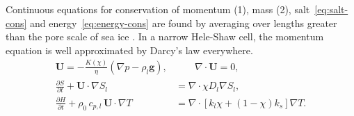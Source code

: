 \documentclass[landscape,24pt, a0paper,colspace=8mm,blockverticalspace=8mm]{tikzposter}
\begin{document}
\begin{columns}
{%



\vspace{-0.9em} } 

\begin{subcolumns}  



{

\begin{minipage}[t]{0.49\linewidth}
Continuous equations for conservation of momentum (1), mass (2), salt~\eqref{eq:salt-cons} and energy~\eqref{eq:energy-cons} are found by averaging over lengths greater than the pore scale of sea ice \cite{Worster1991,LeBars2006}. In a narrow Hele-Shaw cell, the momentum equation is well approximated by Darcy's law everywhere. 
\vspace{0.2em}
\begin{align}


     \mathbf{U} = -\frac{K(\chi)}{\eta} \left(\nabla p - \rho_l \mathbf{g} \right), & \quad \quad   \nabla \cdot \mathbf{U} = 0, \tag{1, 2}  \\
    \frac{\partial S}{\partial t} + \mathbf{U} \cdot \nabla S_l &= \nabla \cdot \chi D_l \nabla S_l, \label{eq:salt-cons} \tag{3} \\
    \frac{\partial H}{\partial t} + \rho_0 \, c_{p,l} \, \mathbf{U} \cdot \nabla  T &= \nabla \cdot \left[ k_l \chi + (1-\chi) k_s \right] \nabla T . \label{eq:energy-cons} \tag{4}


\end{align}
\end{minipage}}
\end{subcolumns}
\end{columns}
\end{document}
